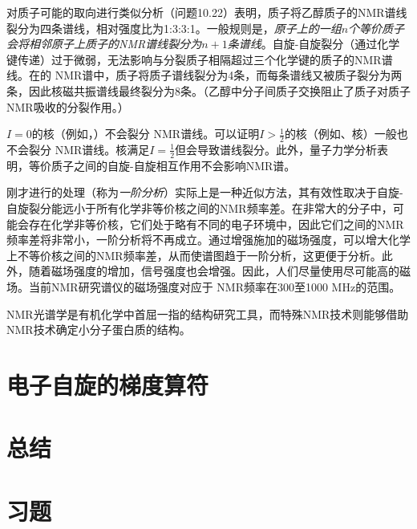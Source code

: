     对质子可能的取向进行类似分析（问题10.22）表明，质子将乙醇质子的NMR谱线裂分为四条谱线，相对强度比为1:3:3:1。一般规则是，\textit{原子上的一组$n$个等价质子会将相邻原子上质子的NMR谱线裂分为$n+1$条谱线}。自旋-自旋裂分（通过化学键传递）过于微弱，无法影响与分裂质子相隔超过三个化学键的质子的NMR谱线。在的 NMR谱中，质子将质子谱线裂分为4条，而每条谱线又被质子裂分为两条，因此核磁共振谱线最终裂分为8条。（乙醇中分子间质子交换阻止了质子对质子NMR吸收的分裂作用。）

    $I=0$的核（例如，）不会裂分 NMR谱线。可以证明$I > \frac{1}{2}$的核（例如、核）一般也不会裂分 NMR谱线。核满足$I = \frac{1}{2}$但会导致谱线裂分。此外，量子力学分析表明，等价质子之间的自旋-自旋相互作用不会影响NMR谱。

    刚才进行的处理（称为\textit{一阶分析}）实际上是一种近似方法，其有效性取决于自旋-自旋裂分能远小于所有化学非等价核之间的NMR频率差。在非常大的分子中，可能会存在化学非等价核，它们处于略有不同的电子环境中，因此它们之间的NMR频率差将非常小，一阶分析将不再成立。通过增强施加的磁场强度，可以增大化学上不等价核之间的NMR频率差，从而使谱图趋于一阶分析，这更便于分析。此外，随着磁场强度的增加，信号强度也会增强。因此，人们尽量使用尽可能高的磁场。当前NMR研究谱仪的磁场强度对应于 NMR频率在300至1000 MHz的范围。

    NMR光谱学是有机化学中首屈一指的结构研究工具，而特殊NMR技术则能够借助NMR技术确定小分子蛋白质的结构。

\section{电子自旋的梯度算符}
\label{sec:10.10 Ladder Operators for Electron Spin}

\section*{总结}

\section*{习题}